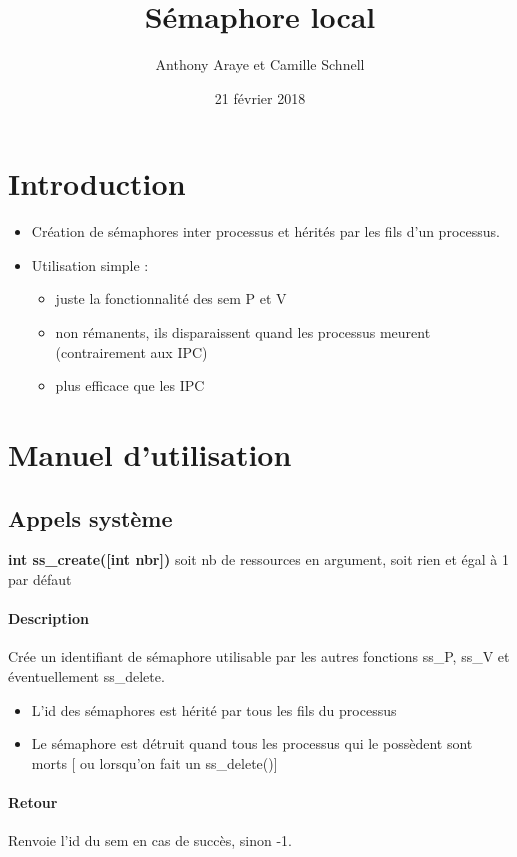 \documentclass[12pt]{article}
\title{Sémaphore local}
\author{Anthony Araye et Camille Schnell}
\date{21 février 2018}
\begin{document}
\maketitle
\renewcommand{\contentsname}{Sommaire}
\tableofcontents
\newpage
\section{Introduction}
  \begin{itemize}
    \item Création de sémaphores inter processus et hérités par les fils d'un processus.
    \item Utilisation simple :
    \begin{itemize}
      \item juste la fonctionnalité des sem P et V
      \item non rémanents, ils disparaissent quand les processus meurent (contrairement aux IPC)
      \item plus efficace que les IPC
    \end{itemize}
  \end{itemize}
\newpage
\section{Manuel d'utilisation}
  \subsection{Appels système}
      \textbf{int ss_create([int nbr])}  soit nb de ressources en argument, soit rien et égal à 1 par défaut \\
      \paragraph{Description\\}
      Crée un identifiant de sémaphore utilisable par les autres fonctions ss_P, ss_V et éventuellement ss_delete. \\
      \begin{itemize}
        \item L'id des sémaphores est hérité par tous les fils du processus
        \item Le sémaphore est détruit quand tous les processus qui le possèdent sont morts [ ou lorsqu'on fait un ss_delete()]
      \end{itemize}
      \paragraph{Retour\\}
      Renvoie l'id du sem en cas de succès, sinon -1.
\end{document}

